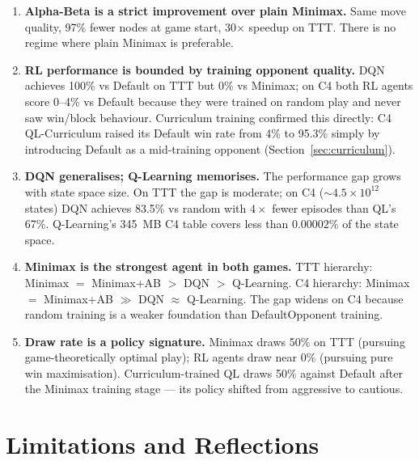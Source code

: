 \documentclass[11pt,a4paper]{article}
\begin{document}
\begin{enumerate}[noitemsep]

\item \textbf{Alpha-Beta is a strict improvement over plain Minimax.} Same move quality, 97\%
fewer nodes at game start, 30$\times$ speedup on TTT. There is no regime where plain Minimax is
preferable.

\item \textbf{RL performance is bounded by training opponent quality.} DQN achieves 100\% vs Default
on TTT but 0\% vs Minimax; on C4 both RL agents score 0--4\% vs Default because they were trained on
random play and never saw win/block behaviour. Curriculum training confirmed this directly: C4
QL-Curriculum raised its Default win rate from 4\% to 95.3\% simply by introducing Default as a
mid-training opponent (Section~\ref{sec:curriculum}).

\item \textbf{DQN generalises; Q-Learning memorises.} The performance gap grows with state space
size. On TTT the gap is moderate; on C4 ($\sim4.5\times10^{12}$ states) DQN achieves 83.5\% vs
random with $4\times$ fewer episodes than QL's 67\%. Q-Learning's 345~MB C4 table covers less than
$0.00002\%$ of the state space.

\item \textbf{Minimax is the strongest agent in both games.}
TTT hierarchy: Minimax $=$ Minimax+AB $>$ DQN $>$ Q-Learning.
C4 hierarchy: Minimax $=$ Minimax+AB $\gg$ DQN $\approx$ Q-Learning.
The gap widens on C4 because random training is a weaker foundation than DefaultOpponent training.

\item \textbf{Draw rate is a policy signature.} Minimax draws 50\% on TTT (pursuing game-theoretically
optimal play); RL agents draw near 0\% (pursuing pure win maximisation). Curriculum-trained QL draws
50\% against Default after the Minimax training stage --- its policy shifted from aggressive to cautious.

\end{enumerate}

\section{Limitations and Reflections}
\label{sec:limitations}
\end{document}
